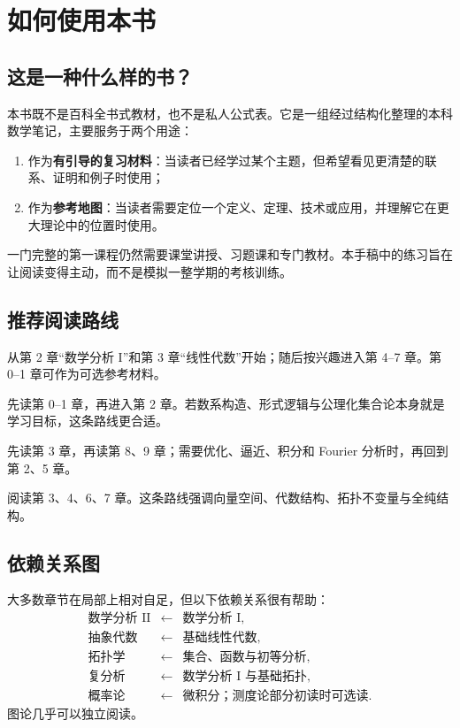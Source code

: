 \chapter*{如何使用本书}

\section*{这是一种什么样的书？}

本书既不是百科全书式教材，也不是私人公式表。它是一组经过结构化整理的本科数学笔记，主要服务于两个用途：
\begin{enumerate}
    \item 作为\textbf{有引导的复习材料}：当读者已经学过某个主题，但希望看见更清楚的联系、证明和例子时使用；
    \item 作为\textbf{参考地图}：当读者需要定位一个定义、定理、技术或应用，并理解它在更大理论中的位置时使用。
\end{enumerate}
一门完整的第一课程仍然需要课堂讲授、习题课和专门教材。本手稿中的练习旨在让阅读变得主动，而不是模拟一整学期的考核训练。

\section*{推荐阅读路线}

\begin{description}[leftmargin=3.3cm,style=nextline]
    \item[标准本科路线] 从第 2 章“数学分析 I”和第 3 章“线性代数”开始；随后按兴趣进入第 4--7 章。第 0--1 章可作为可选参考材料。
    \item[基础路线] 先读第 0--1 章，再进入第 2 章。若数系构造、形式逻辑与公理化集合论本身就是学习目标，这条路线更合适。
    \item[计算与数据路线] 先读第 3 章，再读第 8、9 章；需要优化、逼近、积分和 Fourier 分析时，再回到第 2、5 章。
    \item[结构路线] 阅读第 3、4、6、7 章。这条路线强调向量空间、代数结构、拓扑不变量与全纯结构。
\end{description}

\section*{依赖关系图}

大多数章节在局部上相对自足，但以下依赖关系很有帮助：
\[
\begin{array}{ccl}
\text{数学分析 II} &\longleftarrow& \text{数学分析 I},\\
\text{抽象代数} &\longleftarrow& \text{基础线性代数},\\
\text{拓扑学} &\longleftarrow& \text{集合、函数与初等分析},\\
\text{复分析} &\longleftarrow& \text{数学分析 I 与基础拓扑},\\
\text{概率论} &\longleftarrow& \text{微积分；测度论部分初读时可选读}.
\end{array}
\]
图论几乎可以独立阅读。


